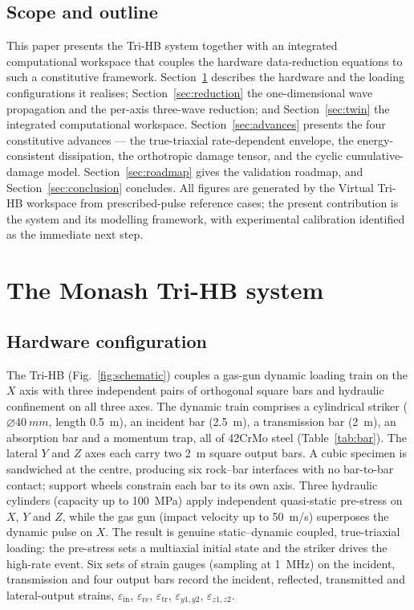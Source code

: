 \documentclass[11pt]{article}
\providecommand{\SI}[2]{\qty{#1}{#2}}
\providecommand{\diameter}{\ensuremath{\varnothing}}
\newcommand{\eps}{\varepsilon}
\begin{document}
\subsection{Scope and outline}

This paper presents the Tri-HB system together with an integrated computational workspace
that couples the hardware data-reduction equations to such a constitutive
framework. Section~\ref{sec:system} describes the hardware and the loading
configurations it realises; Section~\ref{sec:reduction} the one-dimensional wave
propagation and the per-axis three-wave reduction; and
Section~\ref{sec:twin} the integrated computational workspace. Section~\ref{sec:advances} presents the four constitutive advances --- the
true-triaxial rate-dependent envelope, the energy-consistent dissipation, the
orthotropic damage tensor, and the cyclic cumulative-damage model. Section~\ref{sec:roadmap} gives the validation roadmap,
and Section~\ref{sec:conclusion} concludes. All figures are generated by the
Virtual Tri-HB workspace from prescribed-pulse reference cases; the present
contribution is the system and its modelling framework, with experimental
calibration identified as the immediate next step.

\section{The Monash Tri-HB system}\label{sec:system}

\subsection{Hardware configuration}

The Tri-HB (Fig.~\ref{fig:schematic}) couples a gas-gun dynamic loading train on
the $X$ axis with three independent pairs of orthogonal square bars and hydraulic
confinement on all three axes. The dynamic train comprises a cylindrical striker
($\diameter\SI{40}{mm}$, length \SI{0.5}{m}), an incident bar (\SI{2.5}{m}), a
transmission bar (\SI{2}{m}), an absorption bar and a momentum trap, all of
42CrMo steel (Table~\ref{tab:bar}). The lateral $Y$ and $Z$ axes each carry two
\SI{2}{m} square output bars. A cubic specimen is sandwiched at the centre,
producing six rock--bar interfaces with no bar-to-bar contact; support wheels
constrain each bar to its own axis. Three hydraulic cylinders (capacity up to
\SI{100}{MPa}) apply independent quasi-static pre-stress on $X$, $Y$ and $Z$,
while the gas gun (impact velocity up to \SI{50}{m/s}) superposes the dynamic
pulse on $X$. The result is genuine static--dynamic coupled, true-triaxial
loading: the pre-stress sets a multiaxial initial state and the striker drives
the high-rate event. Six sets of strain gauges (sampling at \SI{1}{MHz}) on the
incident, transmission and four output bars record the incident, reflected,
transmitted and lateral-output strains, $\eps_{\mathrm{in}}$, $\eps_{\mathrm{re}}$,
$\eps_{\mathrm{tr}}$, $\eps_{y1,y2}$, $\eps_{z1,z2}$.
\end{document}
